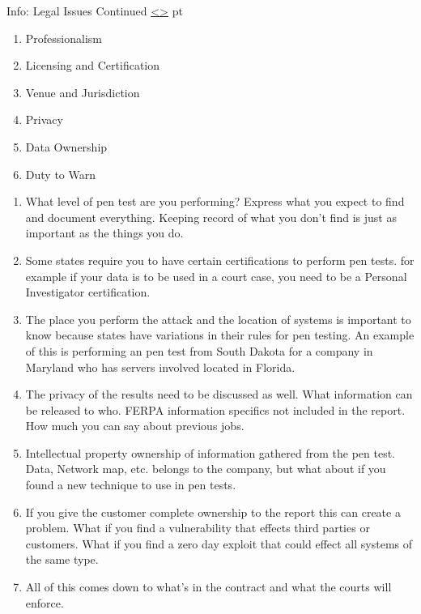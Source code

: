 \documentclass[12pt]{extarticle}
\newenvironment{instructionblock}{\Large\bgroup}{\egroup}
\newcounter{next}
\newcounter{prev}
\begin{document}
\pagebreak
{}
\begin{slide}{Info: Legal Issues Continued}
{\hyperref[slide \theprev]{\textless}\hyperref[slide \thenext]{\textgreater}}
	 pt
	\begin{instructionblock}
		\begin{enumerate}
            \item Professionalism
            \item Licensing and Certification
            \item Venue and Jurisdiction
            \item Privacy
            \item Data Ownership
            \item Duty to Warn
		\end{enumerate}
	\end{instructionblock}
\end{slide}
\begin{enumerate}
\item What level of pen test are you performing? Express what you expect to find and document everything. Keeping record of what you don't find is just as important as the things you do. \cite{Ref:Legal1}
\item Some states require you to have certain certifications to perform pen tests. for example if your data is to be used in a court case, you need to be a Personal Investigator certification. \cite{Ref:Legal1}
\item The place you perform the attack and the location of systems is important to know because states have variations in their rules for pen testing. An example of this is performing an pen test from South Dakota for a company in Maryland who has servers involved located in Florida. \cite{Ref:Legal1}
\item The privacy of the results need to be discussed as well. What information can be released to who. FERPA information specifics not included in the report. How much you can say about previous jobs. \cite{Ref:Legal1}
\item Intellectual property ownership of information gathered from the pen test. Data, Network map, etc. belongs to the company, but what about if you found a new technique to use in pen tests. \cite{Ref:Legal1}
\item If you give the customer complete ownership to the report this can create a problem. What if you find a vulnerability that effects third parties or customers. What if you find a zero day exploit that could effect all systems of the same type. \cite{Ref:Legal1}
\item All of this comes down to what's in the contract and what the courts will enforce. \cite{Ref:Legal1}
\end{enumerate}
\end{document}
